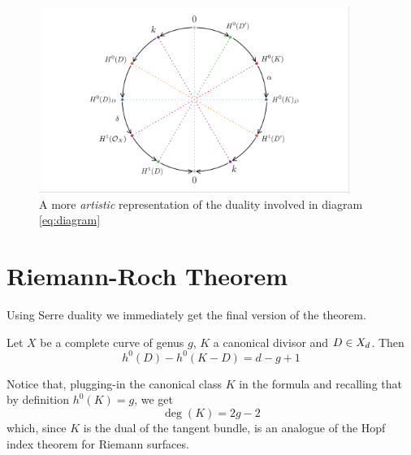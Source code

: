 	\begin{figure}[h]
		\centering
		\includegraphics[width=0.9\textwidth]{Dual_Circle.pdf}
		\caption{ A more \emph{artistic} representation of the duality involved in diagram \eqref{eq:diagram} }
		\label{fig:Dual_Circle}
		\vspace{2em}
	\end{figure}


\section{Riemann-Roch Theorem}
	Using Serre duality we immediately get the final version of the theorem.
	\begin{namedtheo}[\RR Theorem]
		Let $X$ be a complete curve of genus $g$, $K$ a canonical divisor and $D\in X_d$. Then
		\begin{equation}\label{thm:RR}
			h^0(D) - h^0(K-D) = d-g+1
		\end{equation}
	\end{namedtheo}
	Notice that, plugging-in the canonical class $K$ in the \RR formula and recalling that by definition $h^0(K) = g$, we get
	$$ \deg(K) = 2g-2 $$
	which, since $K$ is the dual of the tangent bundle, is an analogue of the Hopf index theorem for Riemann surfaces.
	
	
	
	
	
	
	


